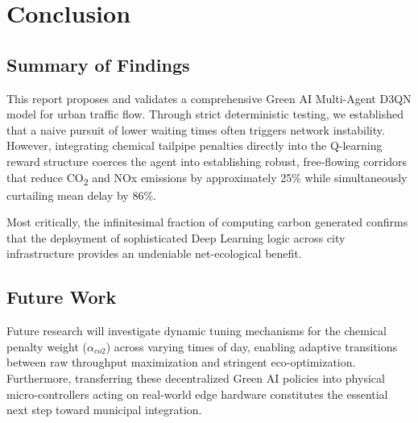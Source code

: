 \chapter{Conclusion}
\label{chap:conclusion}

\section{Summary of Findings}
This report proposes and validates a comprehensive Green AI Multi-Agent D3QN model for urban traffic flow. Through strict deterministic testing, we established that a naive pursuit of lower waiting times often triggers network instability. However, integrating chemical tailpipe penalties directly into the Q-learning reward structure coerces the agent into establishing robust, free-flowing corridors that reduce CO\textsubscript{2} and NOx emissions by approximately 25\% while simultaneously curtailing mean delay by 86\%. 

Most critically, the infinitesimal fraction of computing carbon generated confirms that the deployment of sophisticated Deep Learning logic across city infrastructure provides an undeniable net-ecological benefit.

\section{Future Work}
Future research will investigate dynamic tuning mechanisms for the chemical penalty weight ($\alpha_{co2}$) across varying times of day, enabling adaptive transitions between raw throughput maximization and stringent eco-optimization. Furthermore, transferring these decentralized Green AI policies into physical micro-controllers acting on real-world edge hardware constitutes the essential next step toward municipal integration.
